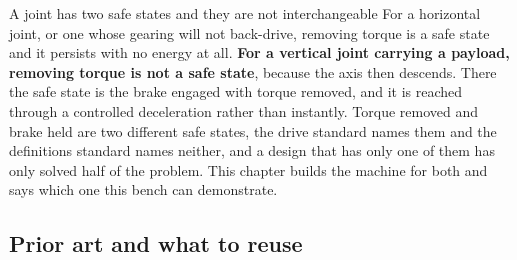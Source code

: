 \begin{note}{A joint has two safe states and they are not interchangeable}
For a horizontal joint, or one whose gearing will not back-drive, removing
torque is a safe state and it persists with no energy at all. \textbf{For a
vertical joint carrying a payload, removing torque is not a safe state}, because
the axis then descends. There the safe state is the brake engaged with torque
removed, and it is reached through a controlled deceleration rather than
instantly. Torque removed and brake held are two different safe states, the
drive standard names them and the definitions standard names neither, and a
design that has only one of them has only solved half of the problem. This
chapter builds the machine for both and says which one this bench can
demonstrate.
\end{note}

\subsection*{Prior art and what to reuse}

